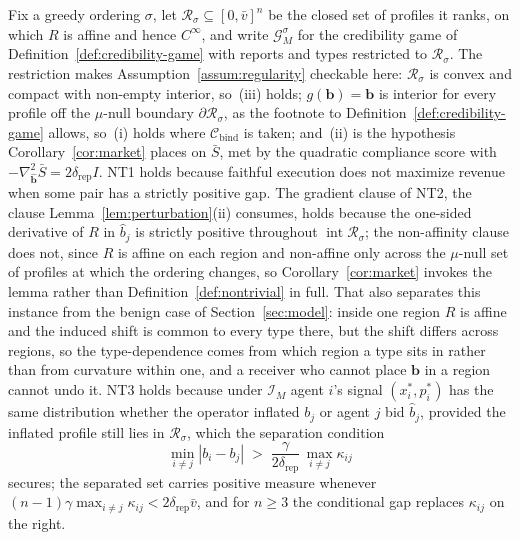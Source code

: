 \documentclass[acmsmall,nonacm,screen]{acmart}
\theoremstyle{acmplain}%
\theoremstyle{acmdefinition}%
\newcommand{\calG}{\mathcal{G}}
\newcommand{\calR}{\mathcal{R}}
\newcommand{\calI}{\mathcal{I}}
\newcommand{\Cbind}{\mathcal{C}_{\mathrm{bind}}}
\newcommand{\Sbar}{\bar{S}}
\numberwithin{equation}{section}
\begin{document}
Fix a greedy ordering $\sigma$, let $\calR_\sigma \subseteq [0,\bar{v}]^n$ be the closed set of profiles it ranks, on which $R$ is affine and hence $C^\infty$, and write $\calG_M^\sigma$ for the credibility game of Definition~\ref{def:credibility-game} with reports and types restricted to $\calR_\sigma$. The restriction makes Assumption~\ref{assum:regularity} checkable here: $\calR_\sigma$ is convex and compact with non-empty interior, so~(iii) holds; $g(\mathbf{b}) = \mathbf{b}$ is interior for every profile off the $\mu$-null boundary $\partial\calR_\sigma$, as the footnote to Definition~\ref{def:credibility-game} allows, so~(i) holds where $\Cbind$ is taken; and~(ii) is the hypothesis Corollary~\ref{cor:market} places on $\Sbar$, met by the quadratic compliance score with $-\nabla^2_{\hat{\mathbf{b}}}\Sbar = 2\delta_{\mathrm{rep}} I$. NT1 holds because faithful execution does not maximize revenue when some pair has a strictly positive gap. The gradient clause of NT2, the clause Lemma~\ref{lem:perturbation}(ii) consumes, holds because the one-sided derivative of $R$ in $\hat{b}_j$ is strictly positive throughout $\operatorname{int}\calR_\sigma$; the non-affinity clause does not, since $R$ is affine on each region and non-affine only across the $\mu$-null set of profiles at which the ordering changes, so Corollary~\ref{cor:market} invokes the lemma rather than Definition~\ref{def:nontrivial} in full. That also separates this instance from the benign case of Section~\ref{sec:model}: inside one region $R$ is affine and the induced shift is common to every type there, but the shift differs across regions, so the type-dependence comes from which region a type sits in rather than from curvature within one, and a receiver who cannot place $\mathbf{b}$ in a region cannot undo it. NT3 holds because under $\calI_M$ agent $i$'s signal $(x_i^*, p_i^*)$ has the same distribution whether the operator inflated $b_j$ or agent $j$ bid $\hat{b}_j$, provided the inflated profile still lies in $\calR_\sigma$, which the separation condition
\begin{equation}\label{eq:market-separation}
\min_{i \neq j} |b_i - b_j| \;>\; \frac{\gamma}{2\delta_{\mathrm{rep}}}\,\max_{i \neq j} \kappa_{ij}
\end{equation}
secures; the separated set carries positive measure whenever $(n-1)\gamma \max_{i \neq j} \kappa_{ij} < 2\delta_{\mathrm{rep}}\bar{v}$, and for $n \geq 3$ the conditional gap replaces $\kappa_{ij}$ on the right.
\end{document}
